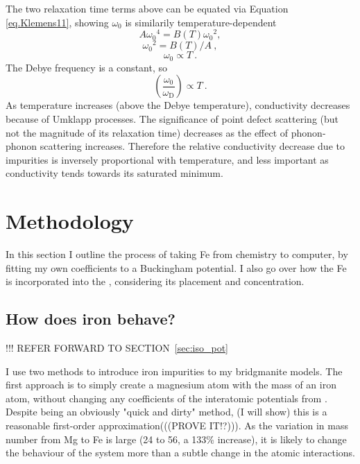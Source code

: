The two relaxation time terms above can be equated via Equation \ref{eq.Klemens11}, showing $\omega_{0}$ is similarily temperature-dependent
%
$$A{\omega_{0}}^{4}=B\left(T\right){\omega_{0}}^{2},$$
$${\omega_{0}}^{2}=B\left(T\right)/A\ ,$$
%
\begin{equation}
\omega_{0} \propto T\ .
\label{eq.Klemens23mod}
\end{equation}
%
The Debye frequency is a constant, so
%
\begin{equation}
\left (\frac{\omega_{\mathrm{0}}}{\omega_{\mathrm{D}}} \right ) \propto T\ .
\label{eq.Klemens23mod2}
\end{equation}
%
As temperature increases (above the Debye temperature), conductivity decreases because of Umklapp processes. The significance of point defect scattering (but not the magnitude of its relaxation time) decreases as the effect of phonon-phonon scattering increases. Therefore the relative conductivity decrease due to impurities is inversely proportional with temperature, and less important as conductivity tends towards its saturated minimum.



\section{Methodology}

In this section I outline the process of taking Fe from chemistry to computer, by fitting my own coefficients to a Buckingham potential. I also go over how the Fe is incorporated into the \mgsio, considering its placement and concentration.

\subsection{How does iron behave?} 

!!! REFER FORWARD TO SECTION~\ref{sec:iso_pot}

I use two methods to introduce iron impurities to my bridgmanite models. The first approach is to simply create a magnesium atom with the mass of an iron atom, without changing any coefficients of the interatomic potentials from \citet{Oganov2000}. Despite being an obviously "quick and dirty" method, (I will show) this is a reasonable first-order approximation(((PROVE IT!?))). As the variation in mass number from Mg to Fe is large (24 to 56, a 133\% increase), it is likely to change the behaviour of the system more than a subtle change in the atomic interactions.

